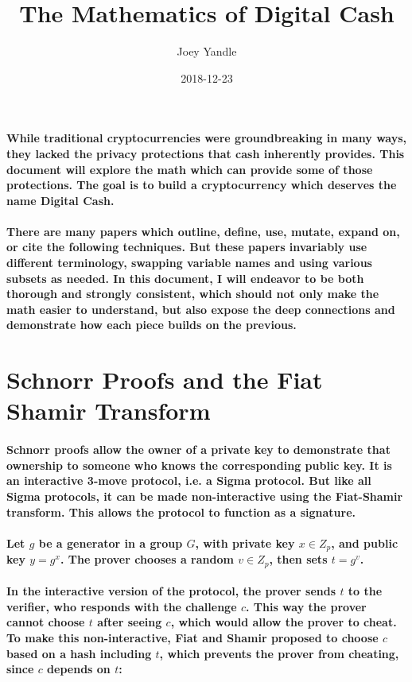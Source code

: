 \documentclass{article}
\title{The Mathematics of Digital Cash}
\date{2018-12-23}
\author{Joey Yandle}
\begin{document}
\maketitle
\paragraph{While traditional cryptocurrencies were groundbreaking in many ways, they lacked the privacy protections that cash inherently provides.  This document will explore the math which can provide some of those protections.  The goal is to build a cryptocurrency which deserves the name Digital Cash.}

\paragraph{There are many papers which outline, define, use, mutate, expand on, or cite the following techniques.  But these papers invariably use different terminology, swapping variable names and using various subsets as needed.  In this document, I will endeavor to be both thorough and strongly consistent, which should not only make the math easier to understand, but also expose the deep connections and demonstrate how each piece builds on the previous. }
\newpage



\section{Schnorr Proofs and the Fiat Shamir Transform}

\paragraph{Schnorr proofs allow the owner of a private key to demonstrate that ownership to someone who knows the corresponding public key.  It is an interactive 3-move protocol, i.e. a Sigma protocol.  But like all Sigma protocols, it can be made non-interactive using the Fiat-Shamir transform.  This allows the protocol to function as a signature.}

\paragraph{Let $g$ be a generator in a group $G$, with private key $x \in Z_p$, and public key $y = g^x$. The prover chooses a random $v \in Z_p$, then sets $t = g^v$.}

\paragraph{In the interactive version of the protocol, the prover sends $t$ to the verifier, who responds with the challenge $c$.  This way the prover cannot choose $t$ after seeing $c$, which would allow the prover to cheat.  To make this non-interactive, Fiat and Shamir proposed to choose $c$ based on a hash including $t$, which prevents the prover from cheating, since $c$ depends on $t$:}
\end{document}
